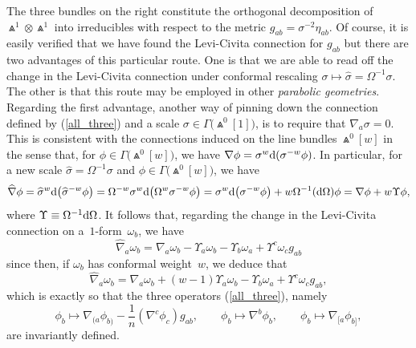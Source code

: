 \documentclass[10pt,a4paper]{amsart}
\numberwithin{equation}{section}
\begin{document}
The three bundles on the right constitute the orthogonal decomposition of
$\Wedge^1\otimes\Wedge^1$ into irreducibles with respect to the metric
$g_{ab}=\sigma^{-2}\eta_{ab}$. Of course, it is easily verified that we have
found the Levi-Civita connection for $g_{ab}$ but there are two advantages of
this particular route. One is that we are able to read off the change in the
Levi-Civita connection under conformal rescaling
$\sigma\mapsto\widehat\sigma=\Omega^{-1}\sigma$. The other is that this route
may be employed in other {\em parabolic geometries}. Regarding the
first advantage, another way of pinning down the connection defined by
(\ref{all_three}) and a scale $\sigma\in\Gamma\big({\Wedge}^0[1]\big)$, is to require
that $\nabla_a\sigma=0$. This is consistent with the connections induced on
the line bundles $\Wedge^0[w]$ in the sense that, for
$\phi\in\Gamma\big({\Wedge}^0[w]\big)$, we have $\nabla\phi=\sigma^w{\rm d}(\sigma^{-w}\phi)$.
In particular, for a new scale $\widehat\sigma=\Omega^{-1}\sigma$ and
$\phi\in\Gamma\big({\Wedge}^0[w]\big)$, we have
\[\widehat\nabla\phi=\widehat\sigma^w {\rm d}\big(\widehat\sigma^{-w}\phi\big)=
\Omega^{-w}\sigma^w{\rm d}\big(\Omega^w\sigma^{-w}\phi\big)
=\sigma^w{\rm d}\big(\sigma^{-w}\phi\big)+w\Omega^{-1}({\rm d}\Omega)\phi
=\nabla\phi+w\Upsilon\phi,\]
where $\Upsilon\equiv\Omega^{-1}{\rm d}\Omega$. It follows that, regarding the
change in the Levi-Civita connection on a~$1$-form~$\omega_b$, we have
\[\widehat\nabla_a\omega_b
=\nabla_a\omega_b-\Upsilon_a\omega_b-\Upsilon_b\omega_a
+\Upsilon^c\omega_cg_{ab}\]
since then, if $\omega_b$ has conformal weight~$w$, we deduce that
\[\widehat\nabla_a\omega_b
=\nabla_a\omega_b+(w-1)\Upsilon_a\omega_b-\Upsilon_b\omega_a
+\Upsilon^c\omega_cg_{ab},\]
which is exactly so that the three operators (\ref{all_three}), namely
\[\textstyle
\phi_b\mapsto\nabla_{(a}\phi_{b)}-\frac1n(\nabla^c\phi_c)g_{ab},\qquad
\phi_b\mapsto\nabla^b\phi_b,\qquad\phi_b\mapsto\nabla_{[a}\phi_{b]},\]
are invariantly defined.
\end{document}
